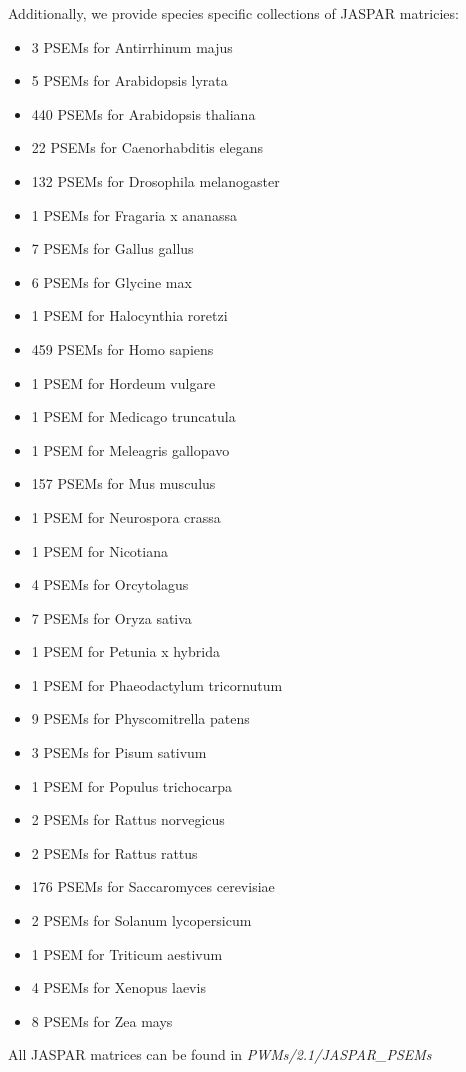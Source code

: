 \documentclass{article}
\begin{document}
Additionally, we provide species specific collections of JASPAR matricies:
\begin{itemize}
\item 3 PSEMs for Antirrhinum majus
\item 5 PSEMs for Arabidopsis lyrata
\item 440 PSEMs for Arabidopsis thaliana
\item 22 PSEMs for Caenorhabditis elegans
\item 132 PSEMs for Drosophila melanogaster
\item 1 PSEMs for Fragaria x ananassa
\item 7 PSEMs for Gallus gallus
\item 6 PSEMs for Glycine max
\item 1 PSEM for Halocynthia roretzi
\item 459 PSEMs for Homo sapiens
\item 1 PSEM for Hordeum vulgare
\item 1 PSEM for Medicago truncatula
\item 1 PSEM for Meleagris gallopavo
\item 157 PSEMs for Mus musculus
\item 1 PSEM for Neurospora crassa
\item 1 PSEM for Nicotiana
\item 4 PSEMs for Orcytolagus
\item 7 PSEMs for Oryza sativa
\item 1 PSEM for Petunia x hybrida
\item 1 PSEM for Phaeodactylum tricornutum
\item 9 PSEMs for Physcomitrella patens
\item 3 PSEMs for Pisum sativum
\item 1 PSEM for Populus trichocarpa
\item 2 PSEMs for Rattus norvegicus
\item 2 PSEMs for Rattus rattus
\item 176 PSEMs for Saccaromyces cerevisiae
\item 2 PSEMs for Solanum lycopersicum
\item 1 PSEM for Triticum aestivum
\item 4 PSEMs for Xenopus laevis
\item 8 PSEMs for Zea mays
\end{itemize}

All JASPAR matrices can be found in \textit{PWMs/2.1/JASPAR\_PSEMs}
\end{document}

